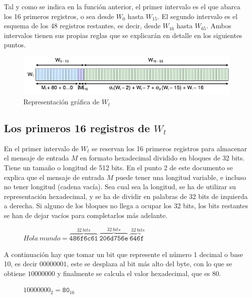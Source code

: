\documentclass{article}
\begin{document}
    Tal y como se indica en la función anterior, el primer intervalo es el que abarca los 16 primeros registros, o sea desde $W_{0}$ hasta $W_{15}$. El segundo intervalo es el esquema de los 48 registros restantes, es decir, desde $W_{16}$ hasta $W_{65}$. Ambos intervalos tienen sus propias reglas que se explicarán en detalle en los siguientes puntos.
        \begin{figure}[H]
        \centering
            \includegraphics[scale=0.5]{img/SHA-256-Wt.png}
            \caption{Representación gráfica de $W_{t}$}
        \end{figure}

    \subsection{Los primeros 16 registros de $W_t$}
        En el primer intervalo de $W_{t}$ se reservan los 16 primeros registros para almacenar el mensaje de entrada $M$ en formato hexadecimal dividido en bloques de 32 bits. Tiene un tamaño o longitud de 512 bits. En el punto 2 de este documento se explica que el mensaje de entrada $M$ puede tener una longitud variable, e incluso no tener longitud (cadena vacía). Sea cual sea la longitud, se ha de utilizar su representación hexadecimal, y se ha de dividir en palabras de 32 bits de izquierda a derecha. Si alguno de los bloques no llega a ocupar los 32 bits, los bits restantes se han de dejar vacíos para completarlos más adelante.
            \begin{figure}[H]
            \centering
                $Hola \ mundo = \overbrace{\texttt{486f6c61}}^{32 \ bits} \ \overbrace{\texttt{206d756e}}^{32 \ bits} \ \overbrace{\texttt{646f\ \ \ \ }}^{32 \ bits}$
            \end{figure}
        
        A continuación hay que tomar un bit que represente el número 1 decimal o base 10, es decir $00000001$, este se desplaza al bit más alto del byte, con lo que se obtiene $10000000$ y finalmente se calcula el valor hexadecimal, que es $80$.
            \begin{figure}[H]
            \centering
                $10000000_{2} = \texttt{80}_{16}$
            \end{figure}
        
\end{document}
